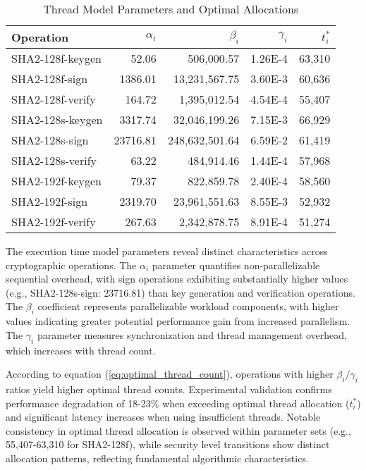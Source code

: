 \documentclass[journal]{IEEEtran}
\begin{document}
\begin{table}[h]
  \centering
  \caption{Thread Model Parameters and Optimal Allocations}
  \label{tab:thread_model_params}
  \begin{tabular}{@{}lrrrr@{}}
    \toprule
    \textbf{Operation} & \boldmath$\alpha_i$ & \boldmath$\beta_i$ & \boldmath$\gamma_i$ & \boldmath$t_i^*$ \\
    \midrule
    SHA2-128f-keygen & 52.06 & 506,000.57 & 1.26E-4 & 63,310 \\
    SHA2-128f-sign & 1386.01 & 13,231,567.75 & 3.60E-3 & 60,636 \\
    SHA2-128f-verify & 164.72 & 1,395,012.54 & 4.54E-4 & 55,407 \\
    SHA2-128s-keygen & 3317.74 & 32,046,199.26 & 7.15E-3 & 66,929 \\
    SHA2-128s-sign & 23716.81 & 248,632,501.64 & 6.59E-2 & 61,419 \\
    SHA2-128s-verify & 63.22 & 484,914.46 & 1.44E-4 & 57,968 \\
    SHA2-192f-keygen & 79.37 & 822,859.78 & 2.40E-4 & 58,560 \\
    SHA2-192f-sign & 2319.70 & 23,961,551.63 & 8.55E-3 & 52,932 \\
    SHA2-192f-verify & 267.63 & 2,342,878.75 & 8.91E-4 & 51,274 \\
    \bottomrule
  \end{tabular}
\end{table}

The execution time model parameters reveal distinct characteristics across cryptographic operations. The $\alpha_i$ parameter quantifies non-parallelizable sequential overhead, with sign operations exhibiting substantially higher values (e.g., SHA2-128s-sign: 23716.81) than key generation and verification operations. The $\beta_i$ coefficient represents parallelizable workload components, with higher values indicating greater potential performance gain from increased parallelism. The $\gamma_i$ parameter measures synchronization and thread management overhead, which increases with thread count.

According to equation (\ref{eq:optimal_thread_count}), operations with higher $\beta_i/\gamma_i$ ratios yield higher optimal thread counts. Experimental validation confirms performance degradation of 18-23\% when exceeding optimal thread allocation ($t_i^*$) and significant latency increases when using insufficient threads. Notable consistency in optimal thread allocation is observed within parameter sets (e.g., 55,407-63,310 for SHA2-128f), while security level transitions show distinct allocation patterns, reflecting fundamental algorithmic characteristics.
\end{document}
